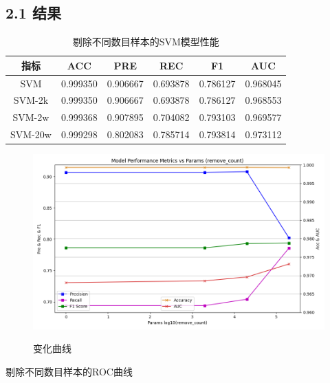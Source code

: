 \documentclass[8pt]{article}
\begin{document}
\subsection*{2.1 结果}
\begin{table}[H]
    \centering
    \caption{剔除不同数目样本的SVM模型性能}
    \begin{tabular}{cccccc}
    \toprule
    指标 & ACC & PRE & REC & F1 & AUC \\
    \midrule
    SVM & 0.999350 & 0.906667 & 0.693878 & 0.786127 & 0.968045\\
    \midrule
    SVM-2k & 0.999350 & 0.906667 & 0.693878 & 0.786127 & 0.968553\\
    \midrule
    SVM-2w & 0.999368 & 0.907895 & 0.704082 & 0.793103 & 0.969577\\
    \midrule
    SVM-20w & 0.999298 & 0.802083 & 0.785714 & 0.793814 & 0.973112\\
    \bottomrule
    \end{tabular}
\end{table}
\begin{figure}[H]
    \centering
    \begin{minipage}{0.7\textwidth}
        \centering
        \includegraphics[width=\textwidth]{../Prob1/out/rand_seed_14/task2/Metrics_curve_rc_0_2k_2w_20w.png}
        \label{fig:Metrics_curve_rc_0_2k_2w_20w}
        \caption{变化曲线}
    \end{minipage}
\end{figure}
剔除不同数目样本的ROC曲线
\end{document}
